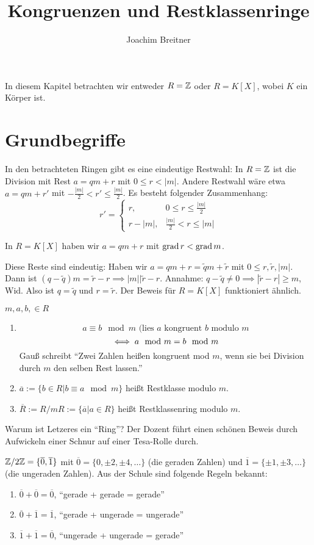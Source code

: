 \documentclass[a4paper,DIV15,BCOR12mm]{article}
\author{Joachim Breitner}
\title{Kongruenzen und Restklassenringe}
\begin{document}
\maketitle

In diesem Kapitel betrachten wir entweder $R=\MdZ$ oder $R=K[X]$,
wobei $K$ ein Körper ist.

\section*{Grundbegriffe}

In den betrachteten Ringen gibt es eine eindeutige Restwahl: In
$R=\MdZ$ ist die Division mit Rest $a=qm+r$ mit $0\le r < |m|$.
Andere Restwahl wäre etwa $a=qm+r'$ mit $-\frac {|m|}2 < r' \le
\frac{|m|}2$. Es besteht folgender Zusammenhang:
$$r' = \begin{cases} r, & 0\le r\le \frac{|m|}{2} \\ r-|m|,& \frac{|m|}2 <
r \le |m|\end{cases}$$ %

In $R=K[X]$ haben wir $a=qm+r$ mit $\mathop{\rm grad}\nolimits r < \mathop{\rm grad}\nolimits m$.

Diese Reste sind eindeutig: Haben wir $a=qm+r=\tilde q m + \tilde r$
mit $0\le r,\tilde r, |m|$. Dann ist $(q-\tilde q)m=\tilde r -r
\implies |m|\big|\tilde r - r$. Annahme: $q-\tilde q \ne 0 \implies
|\tilde r - r| \ge m$, Wid. Also ist $q=\tilde q$ und $r = \tilde
r$. Der Beweis für $R=K[X]$ funktioniert ähnlich.

\begin{definition}[Gauß für $R=\MdZ$]
$m,a,b, \in R$
\begin{enumerate}
\item \[ a \equiv b \mod m \text{ (lies $a$ kongruent $b$ modulo $m$} \]
\[ \iff a \mod m = b\mod m \]
Gauß schreibt "`Zwei Zahlen heißen kongruent mod $m$, wenn sie bei
Division durch $m$ den selben Rest lassen."'
\item $\overline a := \{ b \in R| b \equiv a \mod m \}$ heißt Restklasse modulo $m$.
\item $\overline R := R/mR := \{\overline a | a \in R\}$ heißt Restklassenring modulo $m$.
\end{enumerate}
\end{definition}

Warum ist Letzeres ein "`Ring"'? Der Dozent führt einen schönen
Beweis durch Aufwickeln einer Schnur auf einer Tesa-Rolle durch.

\begin{beispiel}
$\mathbb{Z}/2\mathbb{Z} = \{ \overline 0, \overline 1\}$ mit $\overline 0 = \{0,
\pm 2, \pm 4, \ldots \}$ (die geraden Zahlen) und $\overline 1 =
\{\pm 1, \pm 3, \ldots \}$ (die ungeraden Zahlen). Aus der Schule
sind folgende Regeln bekannt:
\begin{enumerate}
\item $\overline 0 + \overline 0 = \overline 0$, "`gerade + gerade = gerade"'
\item $\overline 0 + \overline 1 = \overline 1$, "`gerade + ungerade = ungerade"'
\item $\overline 1 + \overline 1 = \overline 0$, "`ungerade + ungerade = gerade"'
\end{enumerate}
\end{beispiel}
\end{document}
